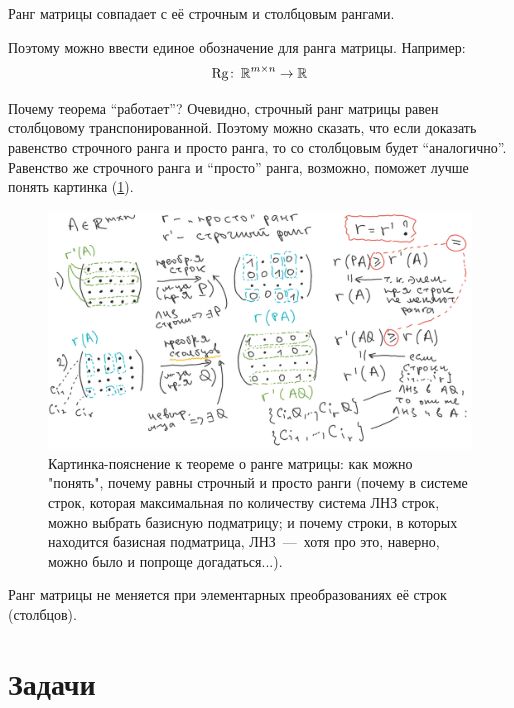\documentclass[a4paper,12pt]{article}
\begin{document}
    \begin{theorem}
      Ранг матрицы совпадает с её строчным и столбцовым рангами.
    \end{theorem}
    
    Поэтому можно ввести единое обозначение для ранга матрицы.
    Например:
    \[
      \Rg\colon \RR^{m\times n} \hm\to \RR
    \]
    
    Почему теорема ``работает''?
    Очевидно, строчный ранг матрицы равен столбцовому транспонированной.
    Поэтому можно сказать, что если доказать равенство строчного ранга и просто ранга, то со столбцовым будет ``аналогично''.
    Равенство же строчного ранга и ``просто'' ранга, возможно, поможет лучше понять картинка (\ref{fig:rangs}).
    
    \begin{figure}[h]
      \centering
    
      \includegraphics[width=0.8\columnwidth]{Rg.png}
    
      \caption{Картинка-пояснение к теореме о ранге матрицы: как можно "понять", почему равны строчный и просто ранги (почему в системе строк, которая максимальная по количеству система ЛНЗ строк, можно выбрать базисную подматрицу; и почему строки, в которых находится базисная подматрица, ЛНЗ~---~хотя про это, наверно, можно было и попроще догадаться...).}
      \label{fig:rangs}
    \end{figure}
  
    \begin{remark}
      Ранг матрицы не меняется при элементарных преобразованиях её строк (столбцов).
    \end{remark}
  
  
  
  \section{Задачи}
  
\end{document}
